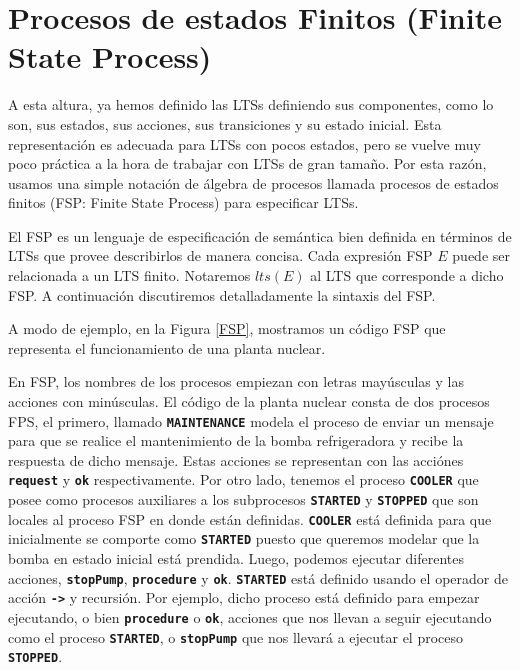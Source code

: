 \section{Procesos de estados Finitos (Finite State Process)}

A esta altura, ya hemos definido las LTSs definiendo sus componentes, como lo son, sus estados, sus acciones, sus
transiciones y su estado inicial. Esta representación es adecuada para LTSs con pocos estados, pero se vuelve muy poco
práctica a la hora de trabajar con LTSs de gran tamaño. Por esta razón, usamos una simple notación de álgebra de
procesos llamada procesos de estados finitos (FSP: Finite State Process) para especificar LTSs.
\cite{644733,Magee:2000:CSM:332036}

El FSP es un lenguaje de especificación de semántica bien definida en términos de LTSs que provee describirlos de
manera concisa. Cada expresión FSP $E$ puede ser relacionada a un LTS finito. Notaremos $lts(E)$ al LTS que corresponde a dicho FSP.
A continuación discutiremos detalladamente la sintaxis del FSP.

A modo de ejemplo, en la Figura \ref{FSP}, mostramos un código FSP que representa el funcionamiento de una planta nuclear.

En FSP, los nombres de los procesos empiezan con letras mayúsculas y las acciones con minúsculas. El código de la planta
nuclear consta de dos procesos FPS, el primero, llamado \texttt{\textbf{MAINTENANCE}} modela el proceso de enviar un
mensaje para que se realice el mantenimiento de la bomba refrigeradora y recibe la respuesta de dicho mensaje. Estas
acciones se representan con las acciónes \texttt{\textbf{request}} y \texttt{\textbf{ok}} respectivamente. Por otro lado,
tenemos el proceso \texttt{\textbf{COOLER}} que posee como procesos auxiliares a los subprocesos \texttt{\textbf{STARTED}}
y \texttt{\textbf{STOPPED}} que son locales al proceso FSP en donde están definidas. \texttt{\textbf{COOLER}} está
definida para que inicialmente se comporte como \texttt{\textbf{STARTED}} puesto que queremos modelar que la bomba en
estado inicial está prendida. Luego, podemos ejecutar diferentes acciones, \texttt{\textbf{stopPump}},
\texttt{\textbf{procedure}} y \texttt{\textbf{ok}}. \texttt{\textbf{STARTED}} está definido usando el operador de acción 
\texttt{\textbf{->}} y recursión. Por ejemplo, dicho proceso está definido para empezar ejecutando, o bien \texttt{\textbf{procedure}}
o \texttt{\textbf{ok}}, acciones que nos llevan a seguir ejecutando como el proceso \texttt{\textbf{STARTED}}, o
\texttt{\textbf{stopPump}} que nos llevará a ejecutar el proceso \texttt{\textbf{STOPPED}}.

